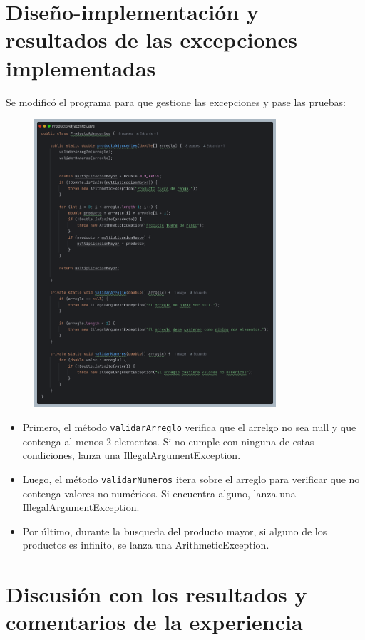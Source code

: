 \documentclass{article}
\begin{document}
\section{Diseño-implementación y resultados de las excepciones implementadas}
Se modificó el programa para que gestione las excepciones y pase las pruebas:
\begin{figure}[H]
    \centering
    \includegraphics[width=0.8\textwidth]{imagenes/solutionv2.png}
\end{figure}
\begin{itemize}
    \item Primero, el método \texttt{validarArreglo} verifica que el arrelgo no sea null y que contenga al menos 2 elementos. Si no cumple con ninguna de estas condiciones, lanza una IllegalArgumentException.
    \item Luego, el método \texttt{validarNumeros} itera sobre el arreglo para verificar que no contenga valores no numéricos. Si encuentra alguno, lanza una IllegalArgumentException.
    \item Por último, durante la busqueda del producto mayor, si alguno de los productos es infinito, se lanza una ArithmeticException.
\end{itemize}


\section{Discusión con los resultados y comentarios de la experiencia}
\end{document}
